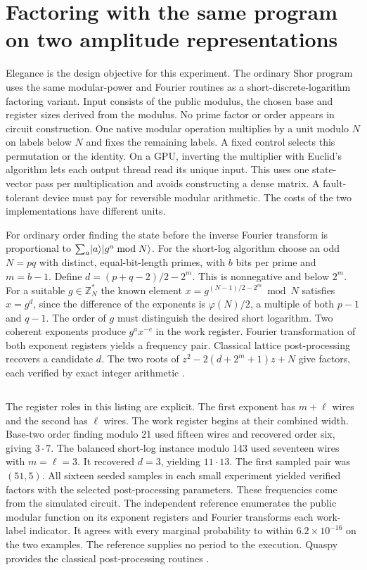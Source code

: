 \section{Factoring with the same program on two amplitude representations}
Elegance is the design objective for this experiment. The ordinary Shor program uses the same modular-power and Fourier routines as a short-discrete-logarithm factoring variant. Input consists of the public modulus, the chosen base and register sizes derived from the modulus. No prime factor or order appears in circuit construction. One native modular operation multiplies by a unit modulo $N$ on labels below $N$ and fixes the remaining labels. A fixed control selects this permutation or the identity. On a GPU, inverting the multiplier with Euclid's algorithm lets each output thread read its unique input. This uses one state-vector pass per multiplication and avoids constructing a dense matrix. A fault-tolerant device must pay for reversible modular arithmetic. The costs of the two implementations have different units.

For ordinary order finding the state before the inverse Fourier transform is proportional to $\sum_a\lvert a\rangle\lvert g^a\bmod N\rangle$. For the short-log algorithm choose an odd $N=pq$ with distinct, equal-bit-length primes, with $b$ bits per prime and $m=b-1$. Define $d=(p+q-2)/2-2^m$. This is nonnegative and below $2^m$. For a suitable $g\in\mathbb{Z}_N^*$ the known element $x=g^{(N-1)/2-2^m}\bmod N$ satisfies $x=g^d$, since the difference of the exponents is $\varphi(N)/2$, a multiple of both $p-1$ and $q-1$. The order of $g$ must distinguish the desired short logarithm. Two coherent exponents produce $g^a x^{-c}$ in the work register. Fourier transformation of both exponent registers yields a frequency pair. Classical lattice post-processing recovers a candidate $d$. The two roots of $z^2-2(d+2^m+1)z+N$ give factors, each verified by exact integer arithmetic \cite{eh,shortpost,shortsuccess}.

\inputminted[firstline=100,fontsize=\footnotesize]{qaf}{../../examples/prefix/factoring.qaf}
The register roles in this listing are explicit. The first exponent has $m+\ell$ wires and the second has $\ell$ wires. The work register begins at their combined width. Base-two order finding modulo 21 used fifteen wires and recovered order six, giving $3\cdot7$. The balanced short-log instance modulo 143 used seventeen wires with $m=\ell=3$. It recovered $d=3$, yielding $11\cdot13$. The first sampled pair was $(51,5)$. All sixteen seeded samples in each small experiment yielded verified factors with the selected post-processing parameters. These frequencies come from the simulated circuit. The independent reference enumerates the public modular function on its exponent registers and Fourier transforms each work-label indicator. It agrees with every marginal probability to within $6.2\times10^{-16}$ on the two examples. The reference supplies no period to the execution. Quaspy provides the classical post-processing routines \cite{orderpost,quaspy}.

